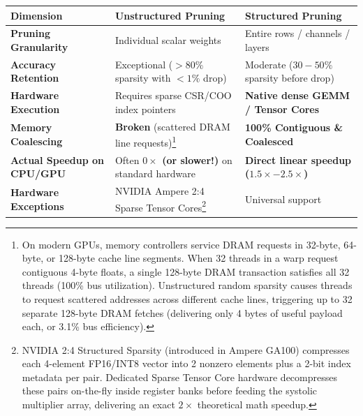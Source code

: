 \documentclass[
  letterpaper,
]{scrbook}
\newcounter{none} %
\begin{document}
{\def\LTcaptype{none} %
\begin{longtable}[]{@{}
  >{\raggedright\arraybackslash}p{}
  >{\centering\arraybackslash}p{}
  >{\centering\arraybackslash}p{}@{}}
\toprule\noalign{}
\begin{minipage}[b]{\linewidth}\raggedright
Dimension
\end{minipage} & \begin{minipage}[b]{\linewidth}\centering
Unstructured Pruning
\end{minipage} & \begin{minipage}[b]{\linewidth}\centering
Structured Pruning
\end{minipage} \\
\midrule\noalign{}
\endhead
\bottomrule\noalign{}
\endlastfoot
\textbf{Pruning Granularity} & Individual scalar weights & Entire rows /
channels / layers \\
\textbf{Accuracy Retention} & Exceptional (\(>80\%\) sparsity with
\(<1\%\) drop) & Moderate (\(30-50\%\) sparsity before drop) \\
\textbf{Hardware Execution} & Requires sparse CSR/COO index pointers &
\textbf{Native dense GEMM / Tensor Cores} \\
\textbf{Memory Coalescing} & \textbf{Broken} (scattered DRAM line
requests)\footnote{On modern GPUs, memory controllers service DRAM
  requests in 32-byte, 64-byte, or 128-byte cache line segments. When 32
  threads in a warp request contiguous 4-byte floats, a single 128-byte
  DRAM transaction satisfies all 32 threads (100\% bus utilization).
  Unstructured random sparsity causes threads to request scattered
  addresses across different cache lines, triggering up to 32 separate
  128-byte DRAM fetches (delivering only 4 bytes of useful payload each,
  or 3.1\% bus efficiency).} & \textbf{100\% Contiguous \& Coalesced} \\
\textbf{Actual Speedup on CPU/GPU} & Often \textbf{\(0\times\) (or
slower!)} on standard hardware & \textbf{Direct linear speedup
(\(1.5\times - 2.5\times\))} \\
\textbf{Hardware Exceptions} & NVIDIA Ampere 2:4 Sparse Tensor
Cores\footnote{NVIDIA 2:4 Structured Sparsity (introduced in Ampere
  GA100) compresses each 4-element FP16/INT8 vector into 2 nonzero
  elements plus a 2-bit index metadata per pair. Dedicated Sparse Tensor
  Core hardware decompresses these pairs on-the-fly inside register
  banks before feeding the systolic multiplier array, delivering an
  exact \(2\times\) theoretical math speedup.} & Universal support \\
\end{longtable}
}
\end{document}
